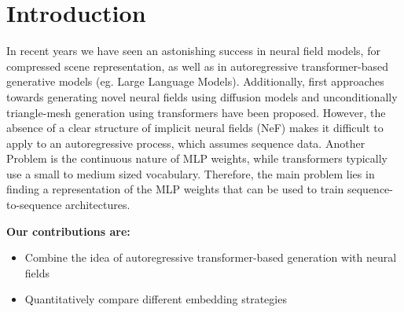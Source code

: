 \section{Introduction}
\label{sec:intro}

In recent years we have seen an astonishing success in neural field models, for compressed scene representation, as well as in autoregressive
transformer-based generative models (eg. Large Language Models).
Additionally, first approaches towards generating novel neural fields using diffusion models \cite{erkoç2023hyperdiffusion} and unconditionally triangle-mesh generation using transformers \cite{siddiqui2023meshgpt} have been proposed.
However, the absence of a clear structure of implicit neural fields (NeF) makes it difficult to apply to an autoregressive process, which assumes sequence data. Another Problem is the continuous nature of MLP weights, while transformers typically use a small to medium sized vocabulary.
Therefore, the main problem lies in finding a representation of the MLP weights that can be used to train sequence-to-sequence architectures.

\noindent \textbf{Our contributions are:}
\begin{itemize}
    \item Combine the idea of autoregressive transformer-based generation with neural fields
    \item Quantitatively compare different embedding strategies
\end{itemize}
